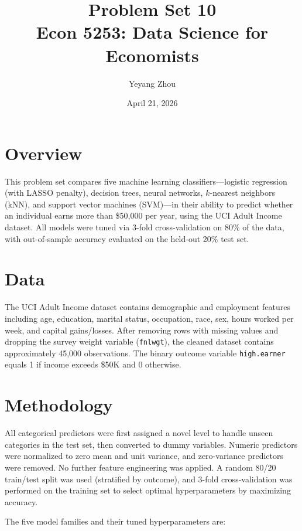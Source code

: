 \documentclass[12pt]{article}
\title{Problem Set 10\\
       \large Econ 5253: Data Science for Economists}
\author{Yeyang Zhou}
\date{April 21, 2026}
\begin{document}
\maketitle

\section*{Overview}

This problem set compares five machine learning classifiers---logistic regression (with LASSO penalty), decision trees, neural networks, $k$-nearest neighbors (kNN), and support vector machines (SVM)---in their ability to predict whether an individual earns more than \$50{,}000 per year, using the UCI Adult Income dataset. All models were tuned via 3-fold cross-validation on 80\% of the data, with out-of-sample accuracy evaluated on the held-out 20\% test set.

\section*{Data}

The UCI Adult Income dataset contains demographic and employment features including age, education, marital status, occupation, race, sex, hours worked per week, and capital gains/losses. After removing rows with missing values and dropping the survey weight variable (\texttt{fnlwgt}), the cleaned dataset contains approximately 45,000 observations. The binary outcome variable \texttt{high.earner} equals 1 if income exceeds \$50K and 0 otherwise.

\section*{Methodology}

All categorical predictors were first assigned a novel level to handle unseen categories in the test set, then converted to dummy variables. Numeric predictors were normalized to zero mean and unit variance, and zero-variance predictors were removed. No further feature engineering was applied. A random 80/20 train/test split was used (stratified by outcome), and 3-fold cross-validation was performed on the training set to select optimal hyperparameters by maximizing accuracy.

The five model families and their tuned hyperparameters are:
\end{document}
